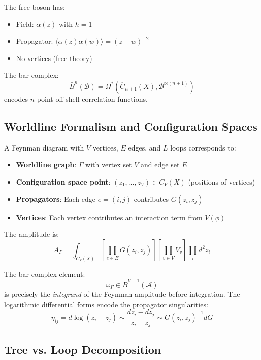 \begin{example}
The free boson has:
\begin{itemize}
\item Field: $\alpha(z)$ with $h=1$
\item Propagator: $\langle \alpha(z)\alpha(w) \rangle = (z-w)^{-2}$
\item No vertices (free theory)
\end{itemize}

The bar complex:
$$\bar{B}^n(\mathcal{B}) = \Omega^*(\overline{C}_{n+1}(X), \mathcal{B}^{\boxtimes (n+1)})$$
encodes $n$-point off-shell correlation functions.
\end{example}

\subsection{Worldline Formalism and Configuration Spaces}

\begin{definition}
A Feynman diagram with $V$ vertices, $E$ edges, and $L$ loops corresponds to:
\begin{itemize}
\item \textbf{Worldline graph}: $\Gamma$ with vertex set $V$ and edge set $E$
\item \textbf{Configuration space point}: $(z_1,\ldots,z_V) \in C_V(X)$ 
(positions of vertices)
\item \textbf{Propagators}: Each edge $e=(i,j)$ contributes $G(z_i,z_j)$
\item \textbf{Vertices}: Each vertex contributes an interaction term from $V(\phi)$
\end{itemize}

The amplitude is:
$$A_\Gamma = \int_{C_V(X)} \left[\prod_{e \in E} G(z_i,z_j)\right] 
\left[\prod_{v \in V} V_v\right] \prod_i d^2z_i$$
\end{definition}

\begin{remark}
The bar complex element:
$$\omega_\Gamma \in \bar{B}^{V-1}(\mathcal{A})$$
is precisely the \emph{integrand} of the Feynman amplitude before integration. 
The logarithmic differential forms encode the propagator singularities:
$$\eta_{ij} = d\log(z_i-z_j) \sim \frac{dz_i-dz_j}{z_i-z_j} \sim G(z_i,z_j)^{-1}dG$$
\end{remark}

\subsection{Tree vs. Loop Decomposition}

